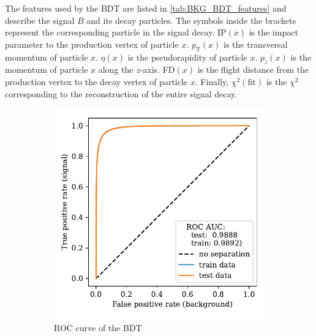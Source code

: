 The features used by the BDT are listed in \autoref{tab:BKG_BDT_features} and describe the signal $B$ and its decay particles.
The symbols inside the brackets represent the corresponding particle in the signal decay.
IP$(x)$ is the impact parameter to the production vertex of particle $x$.
$p_\text{T}(x)$ is the transversal momentum of particle $x$.
$\eta(x)$ is the pseudorapidity of particle $x$.
$p_z(x)$ is the momentum of particle $x$ along the $z$-axis.
FD$(x)$ is the flight distance from the production vertex to the decay vertex of particle $x$.
Finally, $\chi^2(\text{fit})$ is the $\chi^2$ corresponding to the reconstruction of the entire signal decay.

\begin{figure}
    \centering
    \begin{subfigure}{0.5\textwidth}
        \centering
        \includegraphics[width=\textwidth]{images/BKG_BDT_ROC.pdf}
        \caption{ROC curve of the BDT}
        \label{fig:BKG_BDT_ROC}
    \end{subfigure}%
    \begin{subfigure}{0.5\textwidth}
        \centering

\end{subfigure}
\end{figure}
